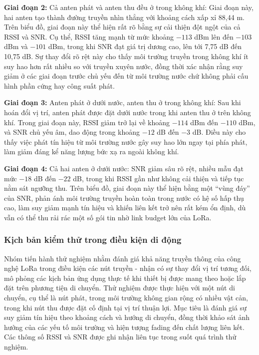\documentclass{article}
\begin{document}
	\textbf{Giai đoạn 2:} Cả anten phát và anten thu đều ở trong không khí: Giai đoạn này, hai anten tạo thành đường truyền nhìn thẳng với khoảng cách xấp xỉ 88,44 m. Trên biểu đồ, giai đoạn này thể hiện rất rõ bằng sự cải thiện đột ngột của cả RSSI và SNR. Cụ thể, RSSI tăng mạnh từ mức khoảng $-113$ dBm lên đến $-103$ dBm và $-101$ dBm, trong khi SNR đạt giá trị dương cao, lên tới 7,75 dB đến 10,75 dB. Sự thay đổi rõ rệt này cho thấy môi trường truyền trong không khí ít suy hao hơn rất nhiều so với truyền xuyên nước, đồng thời xác nhận rằng suy giảm ở các giai đoạn trước chủ yếu đến từ môi trường nước chứ không phải cấu hình phần cứng hay công suất phát.
	
	\textbf{Giai đoạn 3:} Anten phát ở dưới nước, anten thu ở trong không khí: Sau khi hoán đổi vị trí, anten phát được đặt dưới nước trong khi anten thu ở trên không khí. Trong giai đoạn này, RSSI giảm trở lại về khoảng $-114$ dBm đến $-110$ dBm, và SNR chủ yếu âm, dao động trong khoảng $-12$ dB đến $-3$ dB. Điều này cho thấy việc phát tín hiệu từ môi trường nước gây suy hao lớn ngay tại phía phát, làm giảm đáng kể năng lượng bức xạ ra ngoài không khí. 
	
	\textbf{Giai đoạn 4:} Cả hai anten ở dưới nước: SNR giảm sâu rõ rệt, nhiều mẫu đạt mức $-18$ dB đến $-22$ dB, trong khi RSSI gần như không cải thiện và tiếp tục nằm sát ngưỡng thu. Trên biểu đồ, giai đoạn này thể hiện bằng một “vùng đáy” của SNR, phản ánh môi trường truyền hoàn toàn trong nước có hệ số hấp thụ cao, làm suy giảm mạnh tín hiệu và khiến liên kết trở nên rất kém ổn định, dù vẫn có thể thu rải rác một số gói tin nhờ link budget lớn của LoRa.
	
	\subsubsection{Kịch bản kiểm thử trong điều kiện di động}
	
	Nhóm tiến hành thử nghiệm nhằm đánh giá khả năng truyền thông của công nghệ LoRa trong điều kiện các nút truyền - nhận có sự thay đổi vị trí tương đối, mô phỏng các kịch bản ứng dụng thực tế khi thiết bị được mang theo hoặc lắp đặt trên phương tiện di chuyển. Thử nghiệm được thực hiện với một nút di chuyển, cụ thể là nút phát, trong môi trường không gian rộng có nhiều vật cản, trong khi nút thu được đặt cố định tại vị trí thuận lợi. Mục tiêu là đánh giá sự suy giảm tín hiệu theo khoảng cách và hướng di chuyển, đồng thời khảo sát ảnh hưởng của các yếu tố môi trường và hiện tượng fading đến chất lượng liên kết. Các thông số RSSI và SNR được ghi nhận liên tục trong suốt quá trình thử nghiệm.
	
\end{document}
